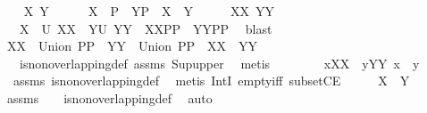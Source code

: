\begin{isabellebody}
\isacommand{{\isacharbraceleft}}\isamarkupfalse%
\isanewline
\ \ \isamarkupfalse%
\ X\ Y\ \isamarkupfalse%
\ \isanewline
\ \ {}{\isacharcolon}\ {\isachardoublequoteopen}X\ {\isasymin}\ {\isacharquery}P{}\ {\isacharampersand}\ Y{\isasymin}{\isacharquery}P{}\ {\isacharampersand}\ X\ {\isasymnoteq}\ Y{\isachardoublequoteclose}\isanewline
\ \ \isamarkupfalse%
\ \isamarkupfalse%
\ XX\ YY\ \ \isanewline
\ \ {}{\isacharcolon}\ {\isachardoublequoteopen}X\ {\isacharequal}\ {\isacharquery}U\ XX\ {\isacharampersand}\ Y{\isacharequal}{\isacharquery}U\ YY\ {\isacharampersand}\ XX{\isasymin}PP\ {\isacharampersand}\ YY{\isasymin}PP{\isachardoublequoteclose}\ \isamarkupfalse%
\ blast\isanewline
\ \ \isamarkupfalse%
\ \isamarkupfalse%
\ {\isachardoublequoteopen}XX\ {\isasymsubseteq}\ Union\ PP\ {\isacharampersand}\ YY\ {\isasymsubseteq}\ Union\ PP\ {\isacharampersand}\ XX\ {\isasyminter}\ YY\ {\isacharequal}\ {\isacharbraceleft}{\isacharbraceright}{\isachardoublequoteclose}\ \isanewline
\ \ \isamarkupfalse%
\ {}\ {}\ is{\isacharunderscore}non{\isacharunderscore}overlapping{\isacharunderscore}def\ assms{\isacharparenleft}{}{\isacharparenright}\ Sup{\isacharunderscore}upper\ \isamarkupfalse%
\ metis\isanewline
\ \ \isamarkupfalse%
\ \isamarkupfalse%
\ \isamarkupfalse%
\ {\isachardoublequoteopen}{\isasymforall}\ x{\isasymin}XX{\isachardot}\ {\isasymforall}\ y{\isasymin}YY{\isachardot}\ x\ {\isasyminter}\ y\ {\isacharequal}\ {\isacharbraceleft}{\isacharbraceright}{\isachardoublequoteclose}\ \isamarkupfalse%
\ {}\ assms{\isacharparenleft}{}{\isacharparenright}\ is{\isacharunderscore}non{\isacharunderscore}overlapping{\isacharunderscore}def\ \isanewline
{}\isamarkupfalse%
\ {\isacharparenleft}metis\ IntI\ empty{\isacharunderscore}iff\ subsetCE{\isacharparenright}\isanewline
\ \ \isamarkupfalse%
\ \isamarkupfalse%
\ {\isachardoublequoteopen}X\ {\isasyminter}\ Y{\isacharequal}{\isacharbraceleft}{\isacharbraceright}{\isachardoublequoteclose}\ \isamarkupfalse%
\ assms\ {}\ {}\ {}\ is{\isacharunderscore}non{\isacharunderscore}overlapping{\isacharunderscore}def\ \isamarkupfalse%
\ auto\isanewline
\isacommand{{\isacharbraceright}}\isamarkupfalse%

\end{isabellebody}

